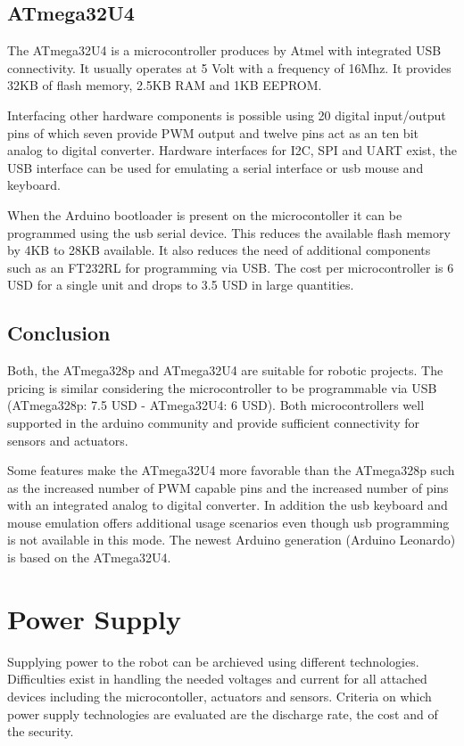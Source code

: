 \subsection{ATmega32U4}
The ATmega32U4 is a microcontroller produces by Atmel with integrated USB connectivity. It usually operates at 5 Volt with a frequency of 16Mhz. It provides 32KB of flash memory, 2.5KB RAM and 1KB EEPROM. 

Interfacing other hardware components is possible using 20 digital input/output pins of which seven provide PWM output and twelve pins act as an ten bit analog to digital converter. Hardware interfaces for I2C, SPI and UART exist, the USB interface can be used for emulating a serial interface or usb mouse and keyboard.

When the Arduino bootloader is present on the microcontoller it can be programmed using the usb serial device. This reduces the available flash memory by 4KB to 28KB available. It also reduces the need of additional components such as an FT232RL for programming via USB.
The cost per microcontroller is 6 USD for a single unit and drops to 3.5 USD in large quantities.
\subsection{Conclusion}
Both, the ATmega328p and ATmega32U4 are suitable for robotic projects. The pricing is similar considering the microcontroller to be programmable via USB (ATmega328p: 7.5 USD - ATmega32U4: 6 USD). Both microcontrollers well supported in the arduino community and provide sufficient connectivity for sensors and actuators.  

Some features make the ATmega32U4 more favorable than the ATmega328p such as the increased number of PWM capable pins and the increased number of pins with an integrated analog to digital converter. In addition the usb keyboard and mouse emulation offers additional usage scenarios even though usb programming is not available in this mode. The newest Arduino generation (Arduino Leonardo) is based on the ATmega32U4.
\section{Power Supply}
Supplying power to the robot can be archieved using different technologies. Difficulties exist in handling the needed voltages and current for all attached devices including the microcontoller, actuators and sensors. Criteria on which power supply technologies are evaluated are the discharge rate, the cost and of the security.
